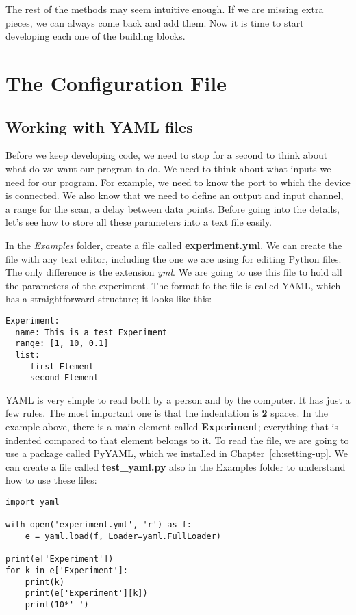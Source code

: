 The rest of the methods may seem intuitive enough. If we are missing extra pieces, we can always come back and add them. Now it is time to start developing each one of the building blocks.

\section{The Configuration File}\label{sec:configuration-file}
\subsection{Working with YAML files}\label{subsec:yaml-files}
Before we keep developing code, we need to stop for a second to think about what do we want our program to do. We need to think about what inputs we need for our program. For example, we need to know the port to which the device is connected. We also know that we need to define an output and input channel, a range for the scan, a delay between data points. Before going into the details, let's see how to store all these parameters into a text file easily.

In the \emph{Examples} folder, create a file called \textbf{experiment.yml}. We can create the file with any text editor, including the one we are using for editing Python files. The only difference is the extension \emph{yml}. We are going to use this file to hold all the parameters of the experiment. The format fo the file is called {YAML}, which has a straightforward structure; it looks like this:

\begin{verbatim}
Experiment:
  name: This is a test Experiment
  range: [1, 10, 0.1]
  list:
   - first Element
   - second Element
\end{verbatim}

{YAML} is very simple to read both by a person and by the computer. It has just a few rules. The most important one is that the indentation is \textbf{2} spaces. In the example above, there is a main element called \textbf{Experiment}; everything that is indented compared to that element belongs to it. To read the file, we are going to use a package called PyYAML, which we installed in Chapter~\ref{ch:setting-up}. We can create a file called \textbf{test\_yaml.py} also in the Examples folder to understand how to use these files:

\begin{verbatim}
import yaml

with open('experiment.yml', 'r') as f:
    e = yaml.load(f, Loader=yaml.FullLoader)

print(e['Experiment'])
for k in e['Experiment']:
    print(k)
    print(e['Experiment'][k])
    print(10*'-')
\end{verbatim}

